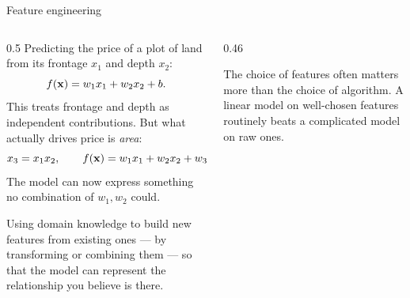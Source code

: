 \documentclass[aspectratio=169,10pt]{beamer}
\begin{document}
\begin{frame}{Feature engineering}
  \footnotesize
  \begin{columns}[T,onlytextwidth]
    \begin{column}{0.5\textwidth}
      Predicting the price of a plot of land from its frontage $x_1$ and depth $x_2$:
      \[ f(\mathbf{x}) = w_1x_1 + w_2x_2 + b . \]
      This treats frontage and depth as independent contributions. But what actually drives
      price is \emph{area}:
      \[ x_3 = x_1 x_2, \qquad f(\mathbf{x}) = w_1x_1 + w_2x_2 + w_3x_3 + b . \]
      The model can now express something no combination of $w_1,w_2$ could.
      \vspace{2mm}
      \begin{defnbox}
        Using domain knowledge to build new features from existing ones --- by transforming
        or combining them --- so that the model can represent the relationship you believe
        is there.
      \end{defnbox}
    \end{column}
    \begin{column}{0.46\textwidth}
      \centering
      \vspace{3mm}
      \begin{keyidea}
        \footnotesize
        The choice of features often matters more than the choice of algorithm. A linear
        model on well-chosen features routinely beats a complicated model on raw ones.
      \end{keyidea}
    \end{column}
  \end{columns}
\end{frame}
\end{document}
